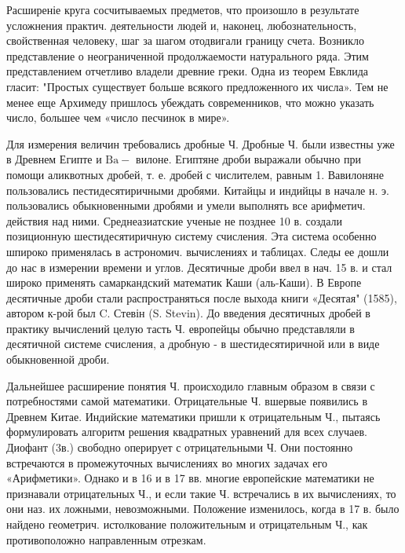 \documentclass[10pt]{article}
\begin{document}
Расширеніе круга сосчитываемых предметов, что произошло в результате усложнения практич. деятельности людей и, наконец, любознательность, свойственная человеку, шаг за шагом отодвигали границу счета. Возникло представление о неограниченной продолжаемости натурального ряда. Этим представлением отчетливо владели древние греки. Одна из теорем Евклида гласит: "Простых существует больше всякого предложенного их числа». Тем не менее еще Архимеду пришлось убеждать современников, что можно указать число, большее чем «число песчинок в мире».



Для измерения величин требовались дробные Ч. Дробные Ч. были известны уже в Древнем Египте и $\mathrm{Ba}-$ вилоне. Египтяне дроби выражали обычно при помощи аликвотных дробей, т. е. дробей с числителем, равным 1. Вавилоняне пользовались пестидесятиричными дробями. Китайцы и индийцы в начале н. э. пользовались обыкновенными дробями и умели выполнять все арифметич. действия над ними. Среднеазиатские ученые не позднее 10 в. создали позиционную шестидесятиричную систему счисления. Эта система особенно шпироко применялась в астрономич. вычислениях и таблицах. Следы ее дошли до нас в измерении времени и углов. Десятичные дроби ввел в нач. 15 в. и стал широко применять самаркандский математик Каши (аль-Каши). В Европе десятичные дроби стали распространяться после выхода книги «Десятая" (1585), автором к-рой был C. Стевін (S. Stevin). До введения десятичных дробей в практику вычислений целую тасть Ч. европейцы обычно представляли в десятичной системе счисления, а дробную - в шестидесятиричной или в виде обыкновенной дроби.



Дальнейшее расширение понятия Ч. происходило главным образом в связи с потребностями самой математики. Отрицательные Ч. вшервые появились в Древнем Китае. Индийские математики пришли к отрицательным Ч., пытаясь формулировать алгоритм решения квадратных уравнений для всех случаев. Диофант (3в.) свободно оперирует с отрицательными Ч. Они постоянно встречаются в промежуточных вычислениях во многих задачах его «Арифметики». Однако и в 16 и в 17 вв. многие европейские математики не признавали отрицательных Ч., и если такие Ч. встречались в их вычислениях, то они наз. их ложными, невозможными. Положение изменилось, когда в 17 в. было найдено геометрич. истолкование положительным и отрицательным Ч., как противоположно направленным отрезкам.
\end{document}
